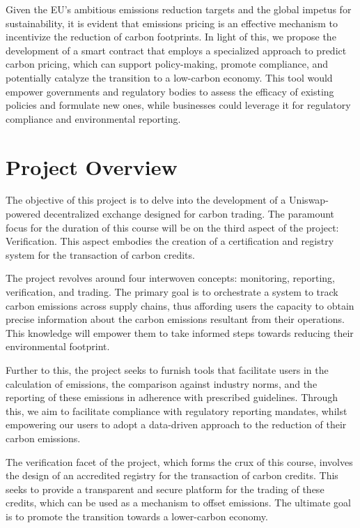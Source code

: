\documentclass[sigconf, authordraft]{acmart}
\begin{document}
	Given the EU's ambitious emissions reduction targets and the global impetus for
	sustainability, it is evident that emissions pricing is an effective mechanism
	to incentivize the reduction of carbon footprints. In light of this, we
	propose the development of a smart contract that employs a specialized
	approach to predict carbon pricing, which can support policy-making, promote
	compliance, and potentially catalyze the transition to a low-carbon economy.
	This tool would empower governments and regulatory bodies to assess the
	efficacy of existing policies and formulate new ones, while businesses could leverage
	it for regulatory compliance and environmental reporting.

	\section{Project Overview}


	The objective of this project is to delve into the development of a Uniswap-powered
	decentralized exchange designed for carbon trading. The paramount focus for
	the duration of this course will be on the third aspect of the project: Verification.
	This aspect embodies the creation of a certification and registry system for
	the transaction of carbon credits.

	The project revolves around four interwoven concepts: monitoring, reporting, verification,
	and trading. The primary goal is to orchestrate a system to track carbon emissions
	across supply chains, thus affording users the capacity to obtain precise
	information about the carbon emissions resultant from their operations. This knowledge
	will empower them to take informed steps towards reducing their environmental footprint.

	Further to this, the project seeks to furnish tools that facilitate users in
	the calculation of emissions, the comparison against industry norms, and the
	reporting of these emissions in adherence with prescribed guidelines. Through this,
	we aim to facilitate compliance with regulatory reporting mandates, whilst empowering
	our users to adopt a data-driven approach to the reduction of their carbon emissions.

	The verification facet of the project, which forms the crux of this course, involves
	the design of an accredited registry for the transaction of carbon credits.
	This seeks to provide a transparent and secure platform for the trading of
	these credits, which can be used as a mechanism to offset emissions. The
	ultimate goal is to promote the transition towards a lower-carbon economy.
\end{document}
